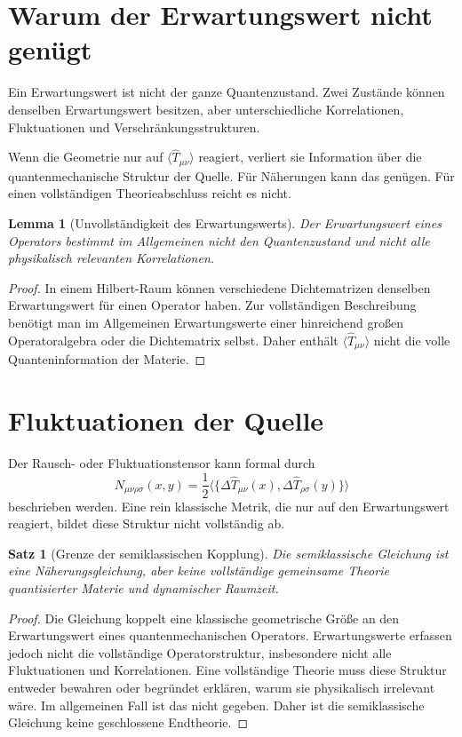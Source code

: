 \documentclass[11pt,a4paper]{book}
\newtheorem{satz}{Satz}[chapter]
\newtheorem{lemma}{Lemma}[chapter]
\theoremstyle{remark}
\begin{document}
\section{Warum der Erwartungswert nicht genügt}
Ein Erwartungswert ist nicht der ganze Quantenzustand. Zwei Zustände können denselben Erwartungswert besitzen, aber unterschiedliche Korrelationen, Fluktuationen und Verschränkungsstrukturen.

Wenn die Geometrie nur auf $\langle \hat T_{\mu\nu}\rangle$ reagiert, verliert sie Information über die quantenmechanische Struktur der Quelle. Für Näherungen kann das genügen. Für einen vollständigen Theorieabschluss reicht es nicht.

\begin{lemma}[Unvollständigkeit des Erwartungswerts]
Der Erwartungswert eines Operators bestimmt im Allgemeinen nicht den Quantenzustand und nicht alle physikalisch relevanten Korrelationen.
\end{lemma}

\begin{proof}
In einem Hilbert-Raum können verschiedene Dichtematrizen denselben Erwartungswert für einen Operator haben. Zur vollständigen Beschreibung benötigt man im Allgemeinen Erwartungswerte einer hinreichend großen Operatoralgebra oder die Dichtematrix selbst. Daher enthält $\langle \hat T_{\mu\nu}\rangle$ nicht die volle Quanteninformation der Materie.
\end{proof}

\section{Fluktuationen der Quelle}
Der Rausch- oder Fluktuationstensor kann formal durch
\begin{equation}
N_{\mu\nu\rho\sigma}(x,y)=\frac{1}{2}\langle \{\Delta \hat T_{\mu\nu}(x),\Delta \hat T_{\rho\sigma}(y)\}\rangle
\end{equation}
beschrieben werden. Eine rein klassische Metrik, die nur auf den Erwartungswert reagiert, bildet diese Struktur nicht vollständig ab.

\begin{satz}[Grenze der semiklassischen Kopplung]
Die semiklassische Gleichung ist eine Näherungsgleichung, aber keine vollständige gemeinsame Theorie quantisierter Materie und dynamischer Raumzeit.
\end{satz}

\begin{proof}
Die Gleichung koppelt eine klassische geometrische Größe an den Erwartungswert eines quantenmechanischen Operators. Erwartungswerte erfassen jedoch nicht die vollständige Operatorstruktur, insbesondere nicht alle Fluktuationen und Korrelationen. Eine vollständige Theorie muss diese Struktur entweder bewahren oder begründet erklären, warum sie physikalisch irrelevant wäre. Im allgemeinen Fall ist das nicht gegeben. Daher ist die semiklassische Gleichung keine geschlossene Endtheorie.
\end{proof}
\end{document}
